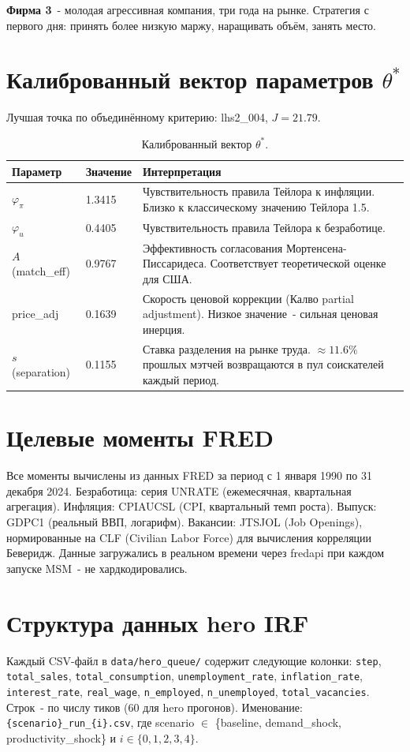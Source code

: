 \documentclass[12pt, a4paper]{article}
\begin{document}
\textbf{Фирма 3}~- молодая агрессивная компания, три года на рынке. Стратегия с первого дня: принять более низкую маржу, наращивать объём, занять место.

\section{Калиброванный вектор параметров $\theta^*$}

Лучшая точка по объединённому критерию: lhs2\_004, $J = 21.79$.

\begin{table}[h]
\centering
\caption{Калиброванный вектор $\theta^*$.}
\begin{tabular}{llp{7cm}}
\toprule
\textbf{Параметр} & \textbf{Значение} & \textbf{Интерпретация} \\
\midrule
$\varphi_{\pi}$ & 1.3415 & Чувствительность правила Тейлора к инфляции. Близко к классическому значению Тейлора 1.5. \\
$\varphi_u$ & 0.4405 & Чувствительность правила Тейлора к безработице. \\
$A$ (match\_eff) & 0.9767 & Эффективность согласования Мортенсена-Писсаридеса. Соответствует теоретической оценке для США. \\
price\_adj & 0.1639 & Скорость ценовой коррекции (Калво partial adjustment). Низкое значение~- сильная ценовая инерция. \\
$s$ (separation) & 0.1155 & Ставка разделения на рынке труда. $\approx 11.6\%$ прошлых мэтчей возвращаются в пул соискателей каждый период. \\
\bottomrule
\end{tabular}
\end{table}

\section{Целевые моменты FRED}

Все моменты вычислены из данных FRED за период с 1 января 1990 по 31 декабря 2024. Безработица: серия UNRATE (ежемесячная, квартальная агрегация). Инфляция: CPIAUCSL (CPI, квартальный темп роста). Выпуск: GDPC1 (реальный ВВП, логарифм). Вакансии: JTSJOL (Job Openings), нормированные на CLF (Civilian Labor Force) для вычисления корреляции Беверидж. Данные загружались в реальном времени через fredapi при каждом запуске MSM~- не хардкодировались.

\section{Структура данных hero IRF}

Каждый CSV-файл в \texttt{data/hero\_queue/} содержит следующие колонки: \texttt{step}, \texttt{total\_sales}, \texttt{total\_consumption}, \texttt{unemployment\_rate}, \texttt{inflation\_rate}, \texttt{interest\_rate}, \texttt{real\_wage}, \texttt{n\_employed}, \texttt{n\_unemployed}, \texttt{total\_vacancies}. Строк~- по числу тиков (60 для hero прогонов). Именование: \texttt{\{scenario\}\_run\_\{i\}.csv}, где scenario $\in$ \{baseline, demand\_shock, productivity\_shock\} и $i \in \{0, 1, 2, 3, 4\}$.
\end{document}
